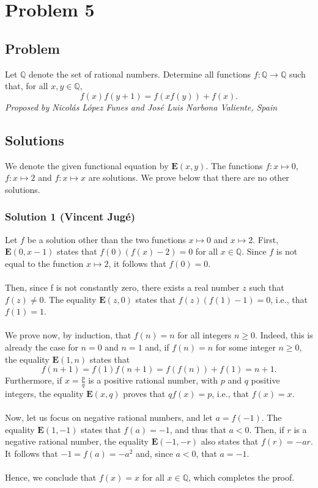 \section{Problem 5}
\subsection{Problem}
Let $\mathbb{Q}$ denote the set of rational numbers. Determine all functions $f:
\mathbb{Q}\rightarrow\mathbb{Q}$ such that, for all $x,y \in\mathbb{Q}$,
\[f(x)f(y+1) = f(xf(y))+f(x).\]
\textit{Proposed by Nicolás López Funes and José Luis Narbona Valiente, Spain}

\subsection{Solutions}
We denote the given functional equation by $\mathbf{E}(x,y)$. The functions 
$f: x \mapsto 0$, $f: x \mapsto 2$ and $f: x \mapsto x$ are solutions. We prove below 
that there are no other solutions.

\subsubsection{Solution 1 (Vincent Jugé)}
Let $f$ be a solution other than the two functions $x \mapsto 0$ and $x \mapsto 2$. First,
$\mathbf{E}(0,x-1)$ states that $f(0)(f(x)-2)=0$ for all $x\in\mathbb{Q}$. Since $f$ is not equal to
the function $x \mapsto 2$, it follows that $f(0)=0$.\\\\
Then, since f is not constantly zero, there exists a real number $z$ such that $f(z)\neq 0$. The
equality $\mathbf{E}(z,0)$ states that $f(z)(f(1)-1)=0$, i.e., that $f(1)=1$.\\\\
We prove now, by induction, that $f(n)=n$ for all integers $n \geq 0$. Indeed, this is already the case
for $n = 0$ and $n = 1$ and, if $f(n)=n$ for some integer $n \geq 0$, the equality
$\mathbf{E}(1,n)$ states that
\[f(n + 1) = f(1)f(n + 1) = f(f(n)) + f(1) = n + 1.\]
Furthermore, if $x=\frac{p}{q}$ is a positive rational number, with $p$ and $q$ positive integers,
the equality $\mathbf{E}(x,q)$ proves that $qf(x)=p$, i.e., that $f(x)=x$.\\\\
Now, let us focus on negative rational numbers, and let $a = f(-1)$. The equality $\mathbf{E}(1, -1)$ states
that $f(a) = -1$, and thus that $a < 0$. Then, if $r$ is a negative rational number, the equality
$\mathbf{E}(-1, -r)$ also states that $f(r) = -ar$. It follows that $-1 = f(a) = -a^2$ and, since
$a<0$, that $a=-1$.\\\\
Hence, we conclude that $f(x)=x$ for all $x\in\mathbb{Q}$, which completes the proof.

